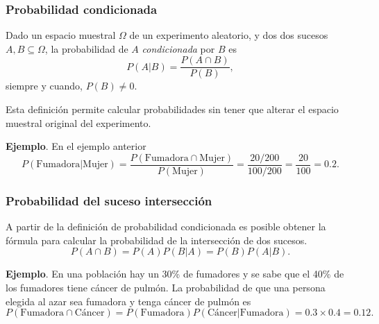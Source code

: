 \begin{frame}
\frametitle{Probabilidad condicionada}
\begin{definicion}
Dado un espacio muestral $\Omega$ de un experimento aleatorio, y dos dos sucesos $A,B\subseteq \Omega$, la probabilidad de $A$ \emph{condicionada} por $B$ es 
\[ 
	P(A|B) = \frac{P(A\cap B)}{P(B)},
\]
siempre y cuando, $P(B)\neq 0$.
\end{definicion}

Esta definición permite calcular probabilidades sin tener que alterar el espacio muestral original del experimento.

\textbf{Ejemplo}. En el ejemplo anterior 
\[
	P(\mbox{Fumadora}|\mbox{Mujer})= \frac{P(\mbox{Fumadora}\cap \mbox{Mujer})}{P(\mbox{Mujer})} =	\frac{20/200}{100/200}=\frac{20}{100}=0.2.
\]

\end{frame}


\begin{frame}
\frametitle{Probabilidad del suceso intersección}
A partir de la definición de probabilidad condicionada es posible obtener la fórmula para calcular la probabilidad de la intersección de dos sucesos.
\[
P(A\cap B) = P(A)P(B|A) = P(B)P(A|B).
\]
	
\textbf{Ejemplo}. En una población hay un 30\% de fumadores y se sabe que el 40\% de los fumadores tiene cáncer de pulmón. 
La probabilidad de que una persona elegida al azar sea fumadora y tenga cáncer de pulmón es
\[
	P(\mbox{Fumadora}\cap \mbox{Cáncer})= P(\mbox{Fumadora})P(\mbox{Cáncer}|\mbox{Fumadora}) =
	0.3\times 0.4 = 0.12.
\]
\end{frame}


